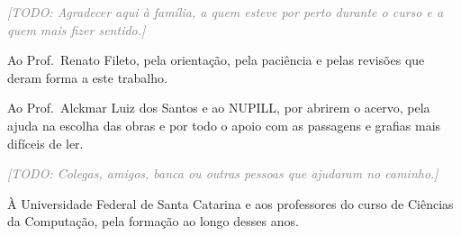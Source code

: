 \documentclass[noabntexcite,oneside]{ufsc-thesis-rn46-2019}
\newcommand{\topic}[1]{\textit{\textcolor{gray}{[TODO: #1]}}}
\begin{document}
\pretextual
\imprimircapa
\imprimirfolhaderosto*
\cleardoublepage
\imprimirfolhadeaprovacao

\begin{agradecimentos}

\topic{Agradecer aqui à família, a quem esteve por perto durante o curso e a quem mais fizer sentido.}

Ao Prof.\ Renato Fileto, pela orientação, pela paciência e pelas revisões que deram forma
a este trabalho.

Ao Prof.\ Alckmar Luiz dos Santos e ao NUPILL, por abrirem o acervo, pela ajuda na escolha
das obras e por todo o apoio com as passagens e grafias mais difíceis de ler.

\topic{Colegas, amigos, banca ou outras pessoas que ajudaram no caminho.}

À Universidade Federal de Santa Catarina e aos professores do curso de Ciências da
Computação, pela formação ao longo desses anos.

\end{agradecimentos}
\end{document}
